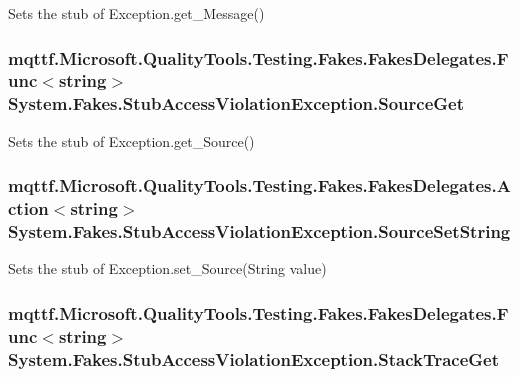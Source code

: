 Sets the stub of Exception.\-get\-\_\-\-Message()

\hypertarget{class_system_1_1_fakes_1_1_stub_access_violation_exception_acdef19800d6c83554977b96f27e65b77}{
\subsubsection[{Source\-Get}]{\setlength{\rightskip}{0pt plus 5cm}mqttf.\-Microsoft.\-Quality\-Tools.\-Testing.\-Fakes.\-Fakes\-Delegates.\-Func$<$string$>$ System.\-Fakes.\-Stub\-Access\-Violation\-Exception.\-Source\-Get}}\label{class_system_1_1_fakes_1_1_stub_access_violation_exception_acdef19800d6c83554977b96f27e65b77}


Sets the stub of Exception.\-get\-\_\-\-Source()

\hypertarget{class_system_1_1_fakes_1_1_stub_access_violation_exception_a9532c041e4206a2fdaffcc01dbafd0b4}{
\subsubsection[{Source\-Set\-String}]{\setlength{\rightskip}{0pt plus 5cm}mqttf.\-Microsoft.\-Quality\-Tools.\-Testing.\-Fakes.\-Fakes\-Delegates.\-Action$<$string$>$ System.\-Fakes.\-Stub\-Access\-Violation\-Exception.\-Source\-Set\-String}}\label{class_system_1_1_fakes_1_1_stub_access_violation_exception_a9532c041e4206a2fdaffcc01dbafd0b4}


Sets the stub of Exception.\-set\-\_\-\-Source(\-String value)

\hypertarget{class_system_1_1_fakes_1_1_stub_access_violation_exception_a4ef457580c60ae908aab38af0de2d9ba}{
\subsubsection[{Stack\-Trace\-Get}]{\setlength{\rightskip}{0pt plus 5cm}mqttf.\-Microsoft.\-Quality\-Tools.\-Testing.\-Fakes.\-Fakes\-Delegates.\-Func$<$string$>$ System.\-Fakes.\-Stub\-Access\-Violation\-Exception.\-Stack\-Trace\-Get}}\label{class_system_1_1_fakes_1_1_stub_access_violation_exception_a4ef457580c60ae908aab38af0de2d9ba}


